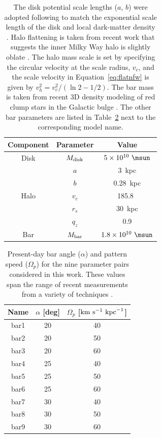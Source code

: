 \documentclass[letterpaper,12pt,preprint]{aastex}
\begin{document}
\begin{table}[ht]
\begin{center}
	\begin{tabular}{ c | c | c }
	         \toprule
	         Component & Parameter & Value \\\toprule
		Disk & $M_{\rm disk}$ & $5 \times 10^{10}~\msun$ \\
		& $a$ & 3~{\rm kpc}\\
		& $b$ & 0.28~{\rm kpc} \\\midrule
	         Halo & $v_c$ & 185.8~\kms\\
		& $r_s$ & 30~kpc \\
		& $q_z$ & 0.9 \\\midrule
		Bar & $M_{\rm bar}$ & $1.8 \times 10^{10}~\msun$ \\
		\bottomrule
		\end{tabular}
	\caption{The disk potential scale lengths ($a$, $b$) were adopted following \citep{bovy15-galpy} to match the exponential scale length of the disk \citep{bovyrix13} and local dark-matter density \citep[e.g.,][]{bovytremaine12}. Halo flattening is taken from recent work that suggests the inner Milky Way halo is slightly oblate \citep{koposov10, kuepper15}. The halo mass scale is set by specifying the circular velocity at the scale radius, $v_c$, and the scale velocity in Equation~\ref{eq:flatnfw} is given by $v_h^2 = v_c^2 / (\ln2 - 1/2)$. The bar mass is taken from recent 3D density modeling of red clump stars in the Galactic bulge \citep{portail15}. The other bar parameters are listed in Table~\ref{tbl:bar-specific} next to the corresponding model name. \label{tbl:potential-params-barred}}
\end{center}
\end{table}

\begin{table}[ht]
\begin{center}
	\begin{tabular}{ c | c | c }
	         \toprule
	         Name & $\alpha$ [deg] & $\Omega_p$ [${\rm km}~{\rm s}^{-1}~{\rm kpc}^{-1}$] \\\toprule
		bar1 & 20 & 40\\
		bar2 & 20 & 50\\
		bar3 & 20 & 60\\
		bar4 & 25 & 40\\
		bar5 & 25 & 50\\
		bar6 & 25 & 60\\
		bar7 & 30 & 40\\
		bar8 & 30 & 50\\
		bar9 & 30 & 60\\
		\bottomrule
		\end{tabular}
	\caption{Present-day bar angle ($\alpha$) and pattern speed ($\Omega_p$) for the nine parameter pairs considered in this work. These values span the range of recent measurements from a variety of techniques \citep{dwek95,wang12,wang13, MOREMOREMORE}. \label{tbl:bar-specific}}
\end{center}
\end{table}
\end{document}
